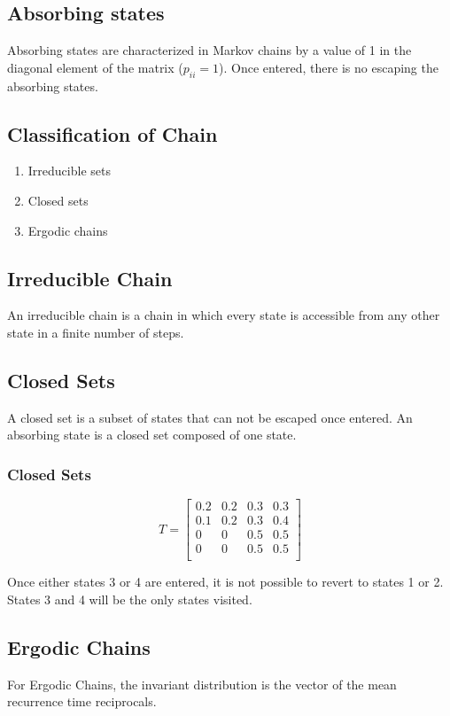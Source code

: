 \subsection{Absorbing states}

Absorbing states are characterized in Markov chains by a value of
1 in the diagonal element of the matrix ($p_{ii} = 1$). Once
entered, there is no escaping the absorbing states.


\subsection{Classification of Chain}
\begin{enumerate}
	\item Irreducible sets \item Closed sets \item Ergodic chains
\end{enumerate}

\subsection{Irreducible Chain}
An irreducible chain is a chain in which every state is accessible
from any other state in a finite number of steps.

\subsection{Closed Sets}
A closed set is a subset of states that can not be escaped once
entered. An absorbing state is a closed set composed of one state.
\subsubsection{Closed Sets}
\[
T= \left[ \begin{array}{cccc} 0.2 & 0.2 & 0.3 & 0.3 \\ 0.1 & 0.2 & 0.3 & 0.4 \\0 & 0 & 0.5 & 0.5 \\0 & 0 & 0.5 & 0.5 \\
\end{array} \right]
\]

Once either states 3 or 4 are entered, it is not possible to
revert to states 1 or 2. States 3 and 4 will be the only states
visited.
\subsection{Ergodic Chains}
For Ergodic Chains, the invariant distribution is the vector of
the mean recurrence time reciprocals.

